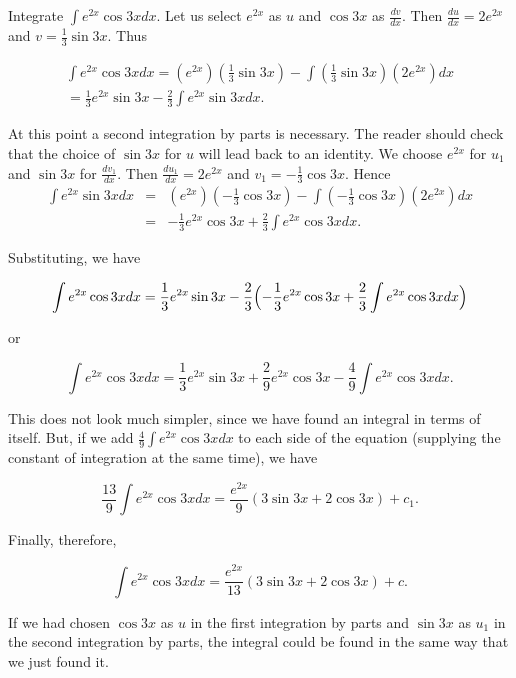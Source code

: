 \begin{example}
Integrate $\int e^{2x} \cos 3xdx$. Let us select $e^{2x}$ as $u$ and $\cos 3x$ as $\frac{dv}{dx}$. 
Then $\frac{du}{dx} = 2e^{2x}$ and $v = \frac{1}{3} \sin 3x$. Thus


\begin{eqnarray*}
\int e^{2x} \cos 3x dx = (e^{2x})(\frac{1}{3} \sin 3x) - \int (\frac{1}{3} \sin 3x)(2e^{2x}) dx \\
= \frac{1}{3} e^{2x} \sin 3x - \frac{2}{3} \int e^{2x} \sin 3x dx. 
\end{eqnarray*}

\noindent At this point a second integration by parts is necessary. The reader should check that the choice of $\sin 3x$ for $u$ will lead back to an identity. We choose $e^{2x}$ for $u_1$ and $\sin 3x$ for $\frac{dv_1}{dx}$. Then $\frac{du_1}{dx} = 2e^{2x}$ and $v_1 = - \frac{1}{3} \cos 3x$. 
Hence 
\begin{eqnarray*}
\int e^{2x} \sin 3x dx 
&=& (e^{2x})(-\frac{1}{3} \cos 3x) - \int (- \frac{1}{3} \cos 3x)(2e^{2x}) dx \\
&=& - \frac{1}{3} e^{2x} \cos 3x + \frac{2}{3} \int e^{2x} \cos 3x dx. 
\end{eqnarray*}

\noindent Substituting, we have

$$
\int e^{2x} \cos 3x dx 
= \frac{1}{3} e^{2x} \sin 3x - \frac{2}{3} \Bigl( -\frac{1}{3} e^{2x} \cos 3x 
+ \frac{2}{3} \int e^{2x} \cos3x dx \Bigr)
$$

\noindent or

$$
\int e^{2x} \cos 3x dx = \frac{1}{3} e^{2x} \sin 3x + \frac{2}{9} e^{2x} \cos 3x 
- \frac{4}{9} \int e^{2x} \cos 3x dx.
$$

\noindent This does not look much simpler, since we have found an integral in terms of itself. 
But, if we add $\frac{4}{9} \int e^{2x} \cos 3x dx$ to each side of the equation (supplying the constant of integration at the same time), we have

$$
\frac{13}{9} \int e^{2x} \cos 3x dx = \frac{e^{2x}}{9} (3 \sin 3x + 2 \cos 3x) + c_1.
$$

\noindent Finally, therefore, 

$$
\int e^{2x} \cos 3x dx = \frac{e^{2x}}{13} (3 \sin 3x + 2 \cos 3x) + c.
$$

\noindent If we had chosen $\cos 3x$ as $u$ in the first integration by parts and $\sin 3x$ as $u_1$ in the second integration by parts, the integral could be found in the same way that we just found it.
\end{example}

